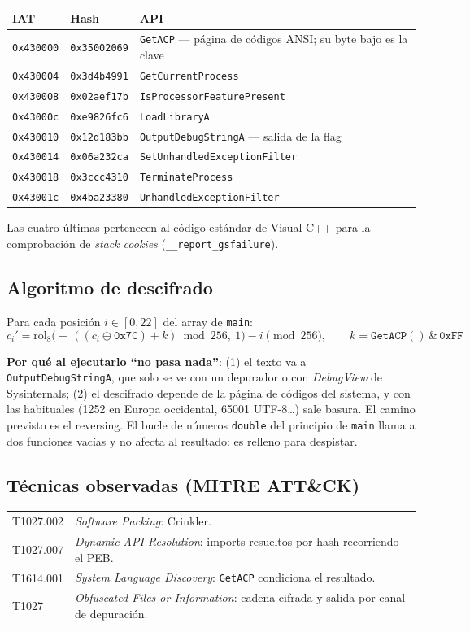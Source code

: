 \documentclass[11pt,a4paper]{article}
\begin{document}
\begin{tabularx}{\linewidth}{@{}llX@{}}
\toprule
\textbf{IAT} & \textbf{Hash} & \textbf{API} \\ \midrule
\texttt{0x430000} & \texttt{0x35002069} & \texttt{GetACP} --- página de códigos ANSI; su byte bajo es la clave \\
\texttt{0x430004} & \texttt{0x3d4b4991} & \texttt{GetCurrentProcess} \\
\texttt{0x430008} & \texttt{0x02aef17b} & \texttt{IsProcessorFeaturePresent} \\
\texttt{0x43000c} & \texttt{0xe9826fc6} & \texttt{LoadLibraryA} \\
\texttt{0x430010} & \texttt{0x12d183bb} & \texttt{OutputDebugStringA} --- salida de la flag \\
\texttt{0x430014} & \texttt{0x06a232ca} & \texttt{SetUnhandledExceptionFilter} \\
\texttt{0x430018} & \texttt{0x3ccc4310} & \texttt{TerminateProcess} \\
\texttt{0x43001c} & \texttt{0x4ba23380} & \texttt{UnhandledExceptionFilter} \\
\bottomrule
\end{tabularx}

Las cuatro últimas pertenecen al código estándar de Visual C++ para la comprobación de \emph{stack cookies}
(\texttt{\_\_report\_gsfailure}).

\subsection{Algoritmo de descifrado}
Para cada posición $i \in [0,22]$ del array de \texttt{main}:
\[ c_i' = \mathrm{rol}_8\!\big(-\,((c_i \oplus \mathtt{0x7C}) + k) \bmod 256,\ 1\big) - i \pmod{256},
   \qquad k = \mathtt{GetACP()} \,\&\, \mathtt{0xFF} \]

\textbf{Por qué al ejecutarlo ``no pasa nada''}: (1) el texto va a \texttt{OutputDebugStringA}, que solo se ve con un
depurador o con \emph{DebugView} de Sysinternals; (2) el descifrado depende de la página de códigos del sistema, y con
las habituales (1252 en Europa occidental, 65001 UTF-8\dots) sale basura. El camino previsto es el reversing.
El bucle de números \texttt{double} del principio de \texttt{main} llama a dos funciones vacías y no afecta al
resultado: es relleno para despistar.

\subsection{Técnicas observadas (MITRE ATT\&CK)}
\begin{tabularx}{\linewidth}{@{}lX@{}}
\toprule
T1027.002 & \emph{Software Packing}: Crinkler. \\
T1027.007 & \emph{Dynamic API Resolution}: imports resueltos por hash recorriendo el PEB. \\
T1614.001 & \emph{System Language Discovery}: \texttt{GetACP} condiciona el resultado. \\
T1027 & \emph{Obfuscated Files or Information}: cadena cifrada y salida por canal de depuración. \\
\bottomrule
\end{tabularx}
\end{document}
